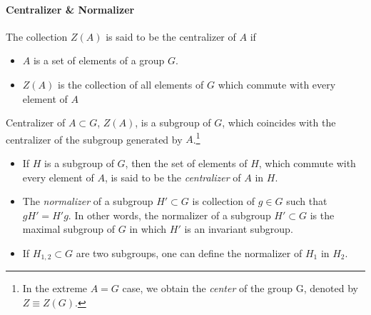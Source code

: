 \paragraph{Centralizer \& Normalizer}
The collection $Z(A)$ is said to be the centralizer of $A$ if
\begin{itemize}
	\item $A$ is a set of elements of a group $G$.
	\item $Z(A)$ is the collection of all elements of $G$ which commute with every element of $A$
\end{itemize}
Centralizer of $A\subset G$, $Z(A)$, is a subgroup of $G$, which coincides with the centralizer of the subgroup generated by $A$.\footnote{In the extreme $A=G$ case, we obtain the \emph{center} of the group G, denoted by $Z\equiv Z(G)$.}
\begin{itemize}
	\item If $H$ is a subgroup of $G$, then the set of elements of $H$, which commute with every element of $A$, is said to be the \emph{centralizer} of $A$ in $H$.
	\item The \emph{normalizer} of a subgroup $H'\subset G$ is collection of $g\in G$ such that $gH'=H'g$. In other words, the normalizer of a subgroup $H'\subset G$ is the maximal subgroup of $G$ in which $H'$ is an invariant subgroup.
	\item If $H_{1,2}\subset G$ are two subgroups, one can define the normalizer of $H_1$ in $H_2$.
\end{itemize}
